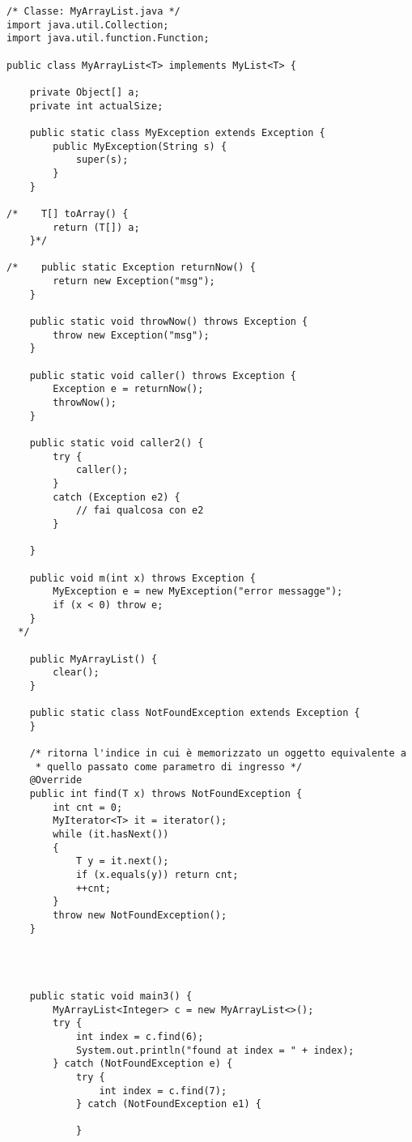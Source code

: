 \begin{lstlisting}
/* Classe: MyArrayList.java */
import java.util.Collection;
import java.util.function.Function;

public class MyArrayList<T> implements MyList<T> {

    private Object[] a;
    private int actualSize;

    public static class MyException extends Exception {
        public MyException(String s) {
            super(s);
        }
    }

/*    T[] toArray() {
        return (T[]) a;
    }*/

/*    public static Exception returnNow() {
        return new Exception("msg");
    }

    public static void throwNow() throws Exception {
        throw new Exception("msg");
    }

    public static void caller() throws Exception {
        Exception e = returnNow();
        throwNow();
    }

    public static void caller2() {
        try {
            caller();
        }
        catch (Exception e2) {
            // fai qualcosa con e2
        }

    }

    public void m(int x) throws Exception {
        MyException e = new MyException("error messagge");
        if (x < 0) throw e;
    }
  */

    public MyArrayList() {
        clear();
    }

    public static class NotFoundException extends Exception {
    }

	/* ritorna l'indice in cui è memorizzato un oggetto equivalente a 
	 * quello passato come parametro di ingresso */
    @Override
    public int find(T x) throws NotFoundException {
        int cnt = 0;
        MyIterator<T> it = iterator();
        while (it.hasNext())
        {
            T y = it.next();
            if (x.equals(y)) return cnt;
            ++cnt;
        }
        throw new NotFoundException();
    }




    public static void main3() {
        MyArrayList<Integer> c = new MyArrayList<>();
        try {
            int index = c.find(6);
            System.out.println("found at index = " + index);
        } catch (NotFoundException e) {
            try {
                int index = c.find(7);
            } catch (NotFoundException e1) {

            }


\end{lstlisting}

